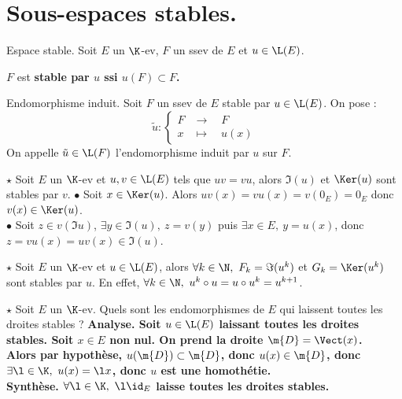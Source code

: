 \documentclass[11pt]{article}
\begin{document}
\section{Sous-espaces stables.}

\begin{defi}{Espace stable.}{}
    Soit $E$ un $\K$-ev, $F$ un ssev de $E$ et $u\in\L(E)$.
    \begin{center}
        $F$ est \bf{stable} par $u$ ssi $u(F)\subset F$.
    \end{center}
\end{defi}

\begin{defi}{Endomorphisme induit.}{}
    Soit $F$ un ssev de $E$ stable par $u\in\L(E)$. On pose :
    \begin{equation*}
        \tilde{u} : \begin{cases}
            F & \to \quad F\\
            x & \mapsto \quad u(x)
        \end{cases}
    \end{equation*}
    On appelle $\tilde{u}\in\L(F)$ l'endomorphisme induit par $u$ sur $F$.
\end{defi}

\vspace*{-0.4cm}

\begin{prop}{$\star$}{}
    Soit $E$ un $\K$-ev et $u,v\in\L(E)$ tels que $uv=vu$, alors $\Im(u)$ et $\Ker(u)$ sont stables par $v$.
    \tcblower
    $\bullet$ Soit $x\in\Ker(u)$. Alors $uv(x)=vu(x)=v(0_E)=0_E$ donc $v(x)\in\Ker(u)$.\\
    $\bullet$ Soit $z\in v(\Im u)$, $\exists y \in \Im(u), ~ z=v(y)$ puis $\exists x \in E, ~ y=u(x)$, donc $z=vu(x)=uv(x)\in\Im(u)$.
\end{prop}

\vspace*{-0.4cm}

\begin{corr}{$\star$}{}
    Soit $E$ un $\K$-ev et $u\in \L(E)$, alors $\forall k \in \N, ~ F_k=\Im(u^k)$ et $G_k=\Ker(u^k)$ sont stables par $u$.
    \tcblower
    En effet, $\forall k \in \N, ~ u^k\circ u = u \circ u^k = u^{k+1}$.
\end{corr}

\vspace*{-0.4cm}

\begin{exi}{$\star$}{}
    Soit $E$ un $\K$-ev. Quels sont les endomorphismes de $E$ qui laissent toutes les droites stables ?
    \tcblower
    \bf{Analyse.} Soit $u\in\L(E)$ laissant toutes les droites stables. Soit $x\in E$ non nul. On prend la droite $\m{D}=\Vect(x)$.\\
    Alors par hypothèse, $u(\m{D})\subset\m{D}$, donc $u(x)\in\m{D}$, donc $\exists \l \in \K, ~ u(x)=\l x$, donc $u$ est une homothétie.\\
    \bf{Synthèse.} $\forall \l \in \K, ~ \l\id_E$ laisse toutes les droites stables.
\end{exi}
\end{document}
